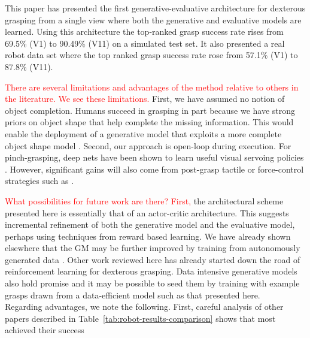This paper has presented the first generative-evaluative architecture for dexterous grasping from a single view where both the generative and evaluative models are learned. Using this architecture the top-ranked grasp success rate rises from 69.5\% (V1) to 90.49\% (V11) on a simulated test set. It also presented a real robot data set where the top ranked grasp success rate rose from 57.1\% (V1) to 87.8\% (V11).

\textcolor{red}{There are several limitations and advantages of the method relative to others in the literature. We see these limitations.} First, we have assumed no notion of object completion. Humans succeed in grasping in part because we have strong priors on object shape that help complete the missing information. This would enable the deployment of a generative model that exploits a more complete object shape model \cite{kopicki2015ijrr}. Second, our approach is open-loop during execution. For pinch-grasping, deep nets have been shown to learn useful visual servoing policies \cite{morrison18}. However, significant gains will also come from post-grasp tactile or force-control strategies such as \cite{Torres2018}. 

\textcolor{red}{What possibilities for future work are there? First,} the architectural scheme presented here is essentially that of an actor-critic architecture. This suggests incremental refinement of both the generative model and the evaluative model, perhaps using techniques from reward based learning. We have already shown elsewhere that the GM may be further improved by training from autonomously generated data \cite{kopicki2019ijrr}. Other work reviewed here \cite{mandikal2021dexterous, Osa2018} has already started down the road of reinforcement learning for dexterous grasping. Data intensive generative models also hold promise \cite{veres2017modeling} and it may be possible to seed them by training with example grasps drawn from a data-efficient model such as that presented here.\\




Regarding advantages, we note the following. First,  careful analysis of other papers described in Table~\ref{tab:robot-results-comparison} shows that most achieved their success 